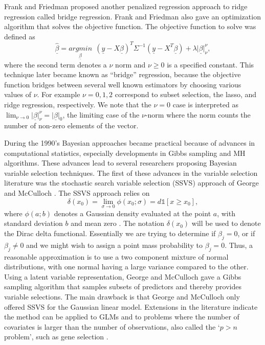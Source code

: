  Frank and Friedman \cite{lldiko1993statistical} proposed another penalized regression approach to ridge regression called bridge regression. Frank and Friedman also gave an optimization algorithm that solves the objective function. 
 The objective function to solve was defined as
 \begin{equation}
\hat{\underline{\beta}}= \underset{\underline{\beta}}{argmin}\ \ (\underline{y} -X\underline{\beta})^T\Sigma^{-1}(\underline{y} -X^T\underline{\beta}) + \lambda\vert\underline{\beta}\vert_{\nu}^{\nu},
  \end{equation}  
where the second term denotes a $\nu$ norm  and $\nu \geq 0$ is a specified constant. This technique later became known as ``bridge'' regression, because the objective function bridges between several well known estimators by choosing various values of $\nu$. For example $\nu = 0,1,2$ correspond to subset selection, the lasso, and ridge regression, respectively. We note that the $\nu=0$ case is interpreted as $\lim_{\nu\to0}\vert\underline{\beta}\vert_{\nu}^{\nu} = \vert\underline{\beta}\vert_0$, the limiting case of the $\nu$-norm where the norm counts the number of non-zero elements of the vector. 
 
 During the 1990's Bayesian approaches became practical because of advances in computational statistics, especially developments in Gibbs sampling and MH algorithms. These advances lead to several researchers proposing Bayesian variable selection techniques. The first of these advances in the variable selection literature was the stochastic search variable selection (SSVS) approach of George and McCulloch \cite{george1993variable}.  The SSVS approach relies on  
 \begin{equation}
  \delta(x_0) = \lim_{\sigma\to 0}\phi(x_0;\sigma) = d\mathds{1}[x\geq x_0],
 \end{equation}
where $\phi(a;b)$ denotes a Gaussian density evaluated at the point $a$, with standard deviation $b$ and mean zero \cite{geweke1996variable,mitchell1988bayesian}. The notation $ \delta(x_0)$ will be used to denote the Dirac delta functional. Essentially we are trying to determine if $\beta_j=0$, or if $\beta_j\neq0$ and we might wish to assign a point mass probability to $\beta_j=0$. Thus, a reasonable approximation is to use a two component mixture of normal distributions, with one normal having a large variance compared to the other. Using a latent variable representation, George and McCulloch gave a Gibbs sampling algorithm that samples subsets of predictors and thereby provides variable selections.  The main drawback is that George and McCulloch only offered SSVS for the Gaussian linear model. Extensions in the literature indicate the method can be applied to GLMs and to problems where the number of covariates is larger than the number of observations, also called the `$p>n$ problem', such as gene selection \cite{yi2003stochastic,george2000variable}.  
     
